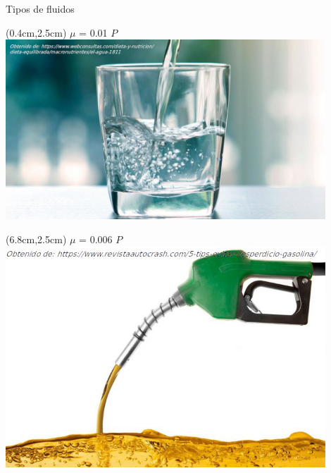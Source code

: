 \documentclass [xcolor=svgnames, t] {beamer}
\begin{document}
\begin{frame}{Tipos de fluidos}
\begin{textblock*}{6.5cm}(0.4cm,2.5cm) %
$\mu$  = 0.01 $P$\\
\includegraphics[width=0.9\textwidth]{fnew}
\end{textblock*}
\begin{textblock*}{6.5cm}(6.8cm,2.5cm) %
$\mu$  = 0.006 $P$\\
\includegraphics[width=0.9\textwidth]{fnew2}
\end{textblock*}
\end{frame}
\end{document}
